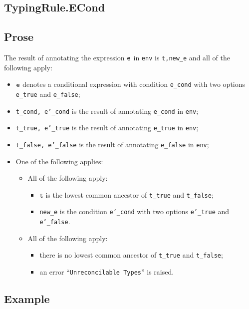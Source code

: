 \documentclass{book}
\newcommand\vt[0]{\texttt{t}}
\begin{document}
\begin{itemize}
\section{TypingRule.ECond \label{sec:TypingRule.ECond}}

  \subsection{Prose}
  The result of annotating the expression $\texttt{e}$ in \texttt{env} is
\texttt{t,new\_e} and all of the following apply:
  \begin{itemize}
  \item $\texttt{e}$ denotes a conditional expression with condition \texttt{e\_cond} with two options \texttt{e\_true} and \texttt{e\_false};
  \item \texttt{t\_cond, e'\_cond} is the result of annotating \texttt{e\_cond} in \texttt{env};
  \item \texttt{t\_true, e'\_true} is the result of annotating \texttt{e\_true} in \texttt{env};
  \item \texttt{t\_false, e'\_false} is the result of annotating \texttt{e\_false} in \texttt{env};
  \item One of the following applies:
    \begin{itemize}
    \item All of the following apply:
      \begin{itemize}
      \item $\vt$ is the lowest common ancestor of \texttt{t\_true} and \texttt{t\_false};
      \item \texttt{new\_e} is the condition \texttt{e'\_cond} with two options \texttt{e'\_true} and \texttt{e'\_false}.
      \end{itemize}
    \item All of the following apply:
      \begin{itemize}
      \item there is no lowest common ancestor of \texttt{t\_true} and \texttt{t\_false};
      \item an error ``\texttt{Unreconcilable Types}'' is raised.
      \end{itemize}
    \end{itemize}
  \end{itemize}

  \subsection{Example}



\end{itemize}
\end{document}
